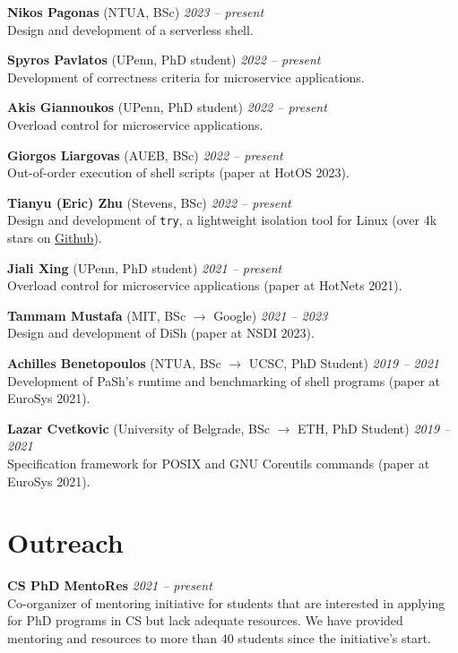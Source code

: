 \documentclass[margin]{res}
\begin{document}
\begin{resume}
\textbf{Nikos Pagonas} (NTUA, BSc) \hfill {\em 2023 -- present} \\
Design and development of a serverless shell.

\textbf{Spyros Pavlatos} (UPenn, PhD student) \hfill {\em 2022 -- present} \\
Development of correctness criteria for microservice applications.

\textbf{Akis Giannoukos} (UPenn, PhD student) \hfill {\em 2022 -- present} \\
Overload control for microservice applications.

\textbf{Giorgos Liargovas} (AUEB, BSc) \hfill {\em 2022 -- present} \\
Out-of-order execution of shell scripts (paper at HotOS 2023).

\textbf{Tianyu (Eric) Zhu} (Stevens, BSc) \hfill {\em 2022 -- present} \\
Design and development of \texttt{try}, a lightweight isolation tool for Linux (over 4k stars on \href{https://github.com/binpash/try}{Github}).

\textbf{Jiali Xing} (UPenn, PhD student) \hfill {\em 2021 -- present} \\
Overload control for microservice applications (paper at HotNets 2021).

\textbf{Tammam Mustafa} (MIT, BSc $\rightarrow$ Google) \hfill {\em 2021 -- 2023} \\
Design and development of DiSh (paper at NSDI 2023).

\textbf{Achilles Benetopoulos} (NTUA, BSc $\rightarrow$ UCSC, PhD Student) \hfill {\em 2019 -- 2021} \\
Development of PaSh's runtime and benchmarking of shell programs (paper at EuroSys 2021). 

\textbf{Lazar Cvetkovic} (University of Belgrade, BSc $\rightarrow$ ETH, PhD Student) \hfill {\em 2019 -- 2021} \\
Specification framework for POSIX and GNU Coreutils commands (paper at EuroSys 2021). 


\section{Outreach}

\textbf{CS PhD MentoRes}  \hfill {\em 2021 -- present} \\
Co-organizer of mentoring initiative for students that are interested in applying for PhD programs in CS but lack adequate resources. We have provided mentoring and resources to more than 40 students since the initiative's start.


\end{resume}
\end{document}

